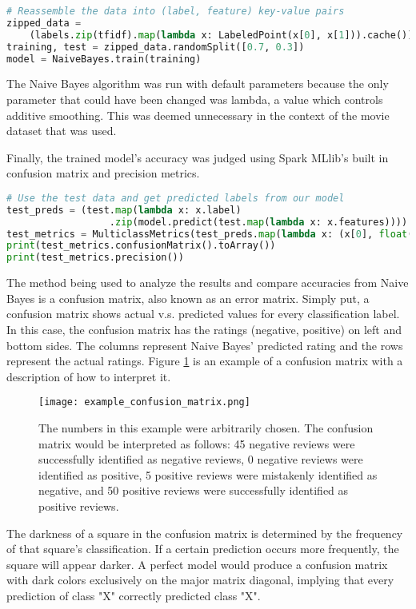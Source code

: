 \documentclass[9pt,twocolumn,twoside]{idsi}
\begin{document}
\begin{lstlisting}[language=Python, breaklines=true]
# Reassemble the data into (label, feature) key-value pairs
zipped_data = 
	(labels.zip(tfidf).map(lambda x: LabeledPoint(x[0], x[1])).cache())
training, test = zipped_data.randomSplit([0.7, 0.3])
model = NaiveBayes.train(training)
\end{lstlisting}

The Naive Bayes algorithm was run with default parameters because the only parameter that could have been changed was lambda, a value which controls additive smoothing. This was deemed unnecessary in the context of the movie dataset that was used. 

Finally, the trained model's accuracy was judged using Spark MLlib's built in confusion matrix and precision metrics.

\begin{lstlisting}[language=Python, breaklines=true]
# Use the test data and get predicted labels from our model
test_preds = (test.map(lambda x: x.label)
                  .zip(model.predict(test.map(lambda x: x.features))))
test_metrics = MulticlassMetrics(test_preds.map(lambda x: (x[0], float(x[1]))))
print(test_metrics.confusionMatrix().toArray())
print(test_metrics.precision())
\end{lstlisting}

The method being used to analyze the results and compare accuracies from Naive Bayes is a confusion matrix, also known as an error matrix. Simply put, a confusion matrix shows actual v.s. predicted values for every classification label. In this case, the confusion matrix has the ratings (negative, positive) on left and bottom sides. The columns represent Naive Bayes' predicted rating and the rows represent the actual ratings. Figure \ref{fig:conf_matrix} is an example of a confusion matrix with a description of how to interpret it.

\begin{figure}[htbp]
\centering
\texttt{[image: example\_confusion\_matrix.png]} 
\caption{The numbers in this example were arbitrarily chosen. The confusion matrix would be interpreted as follows: 45 negative reviews were successfully identified as negative reviews, 0 negative reviews were identified as positive, 5 positive reviews were mistakenly identified as negative, and 50 positive reviews were successfully identified as positive reviews.}
\label{fig:conf_matrix}
\end{figure}
The darkness of a square in the confusion matrix is determined by the frequency of that square's classification. If a certain prediction occurs more frequently, the square will appear darker.
A perfect model would produce a confusion matrix with dark colors exclusively on the major matrix diagonal, implying that every prediction of class "X" correctly predicted class "X". 
\end{document}
